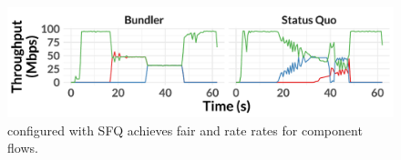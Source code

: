 \begin{figure}
    \centering
\begin{knitrout}
\color{fgcolor}
\includegraphics[width=\maxwidth]{figure/eval:waterfall-1} 

\end{knitrout}
    \caption{\name configured with SFQ achieves fair and rate rates for component flows.}
    \label{fig:eval:waterfall}
\end{figure}

